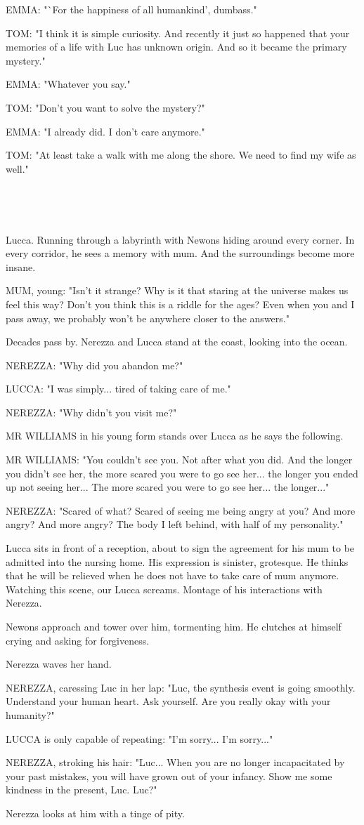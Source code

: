 \documentclass[11pt]{article}
\begin{document}
EMMA: "`For the happiness of all humankind', dumbass."

TOM: "I think it is simple curiosity.
And recently it just so happened that your memories of a life with Luc has unknown origin.
And so it became the primary mystery."

EMMA: "Whatever you say."

TOM: "Don't you want to solve the mystery?"

EMMA: "I already did. I don't care anymore."

TOM: "At least take a walk with me along the shore.
We need to find my wife as well."

\ 

\ 

Lucca.
Running through a labyrinth with Newons hiding around every corner.
In every corridor, he sees a memory with mum.
And the surroundings become more insane.

MUM, young: "Isn't it strange?
Why is it that staring at the universe makes us feel this way?
Don't you think this is a riddle for the ages?
Even when you and I pass away, we probably won't be anywhere closer to the answers."

Decades pass by.
Nerezza and Lucca stand at the coast, looking into the ocean.

NEREZZA: "Why did you abandon me?"

LUCCA: "I was simply... tired of taking care of me."

NEREZZA: "Why didn't you visit me?"

MR WILLIAMS in his young form stands over Lucca as he says the following.

MR WILLIAMS: "You couldn't see you. Not after what you did.
And the longer you didn't see her, the more scared you were to go see her...
the longer you ended up not seeing her...
The more scared you were to go see her...
the longer..."

NEREZZA: "Scared of what?
Scared of seeing me being angry at you?
And more angry?
And more angry?
The body I left behind, with half of my personality."

Lucca sits in front of a reception, about to sign the agreement for his mum to be admitted into the nursing home.
His expression is sinister, grotesque.
He thinks that he will be relieved when he does not have to take care of mum anymore.
Watching this scene, our Lucca screams. 
Montage of his interactions with Nerezza.

Newons approach and tower over him, tormenting him.
He clutches at himself crying and asking for forgiveness.

Nerezza waves her hand.

NEREZZA, caressing Luc in her lap: "Luc, the synthesis event is going smoothly.
Understand your human heart.
Ask yourself.
Are you really okay with your humanity?"

LUCCA is only capable of repeating: "I'm sorry... 
I'm sorry..."

NEREZZA, stroking his hair: "Luc... 
When you are no longer incapacitated by your past mistakes, you will have grown out of your infancy.
Show me some kindness in the present, Luc.
Luc?"

Nerezza looks at him with a tinge of pity.
\end{document}
